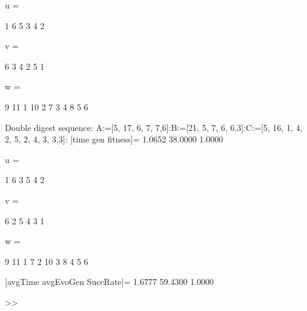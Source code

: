 u =

     1     6     5     3     4     2


v =

     6     3     4     2     5     1


w =

     9    11     1    10     2     7     3     4     8     5     6

Double digest sequence:
A:=[5, 17, 6, 7, 7,6]:B:=[21, 5, 7, 6, 6,3]:C:=[5, 16, 1, 4, 2, 5, 2, 4, 3, 3,3]:
[time gen fitness]=
    1.0652   38.0000    1.0000


u =

     1     6     3     5     4     2


v =

     6     2     5     4     3     1


w =

     9    11     1     7     2    10     3     8     4     5     6

[avgTime  avgEvoGen  SuccRate]=
    1.6777   59.4300    1.0000

>> 